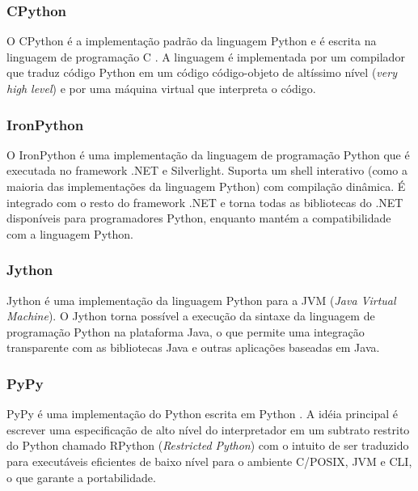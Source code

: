 \subsubsection{CPython}

O CPython é a implementação padrão da linguagem Python e é escrita na linguagem de programação C \cite[p.6]{pypy}. A linguagem é implementada por um compilador que traduz código Python em um código código-objeto de altíssimo nível (\emph{very high level}) e por uma máquina virtual que interpreta o código.

\subsubsection{IronPython}

O IronPython \cite{ironpython} é uma implementação da linguagem de programação Python que é executada no framework .NET e Silverlight. Suporta um shell interativo (como a maioria das implementações da linguagem Python) com compilação dinâmica. É integrado com o resto do framework .NET e torna todas as bibliotecas do .NET disponíveis para programadores Python, enquanto mantém a compatibilidade com a linguagem Python.

\subsubsection{Jython}

Jython \cite{jython} é uma implementação da linguagem Python para a JVM (\emph{Java Virtual Machine}). O Jython torna possível a execução da sintaxe da linguagem de programação Python na plataforma Java, o que permite uma integração transparente com as bibliotecas Java e outras aplicações baseadas em Java. 

\subsubsection{PyPy}

PyPy é uma implementação do Python escrita em Python \cite[p. 7]{pypy}. A idéia principal é escrever uma especificação de alto nível do interpretador em um subtrato restrito do Python chamado RPython (\emph{Restricted Python}) com o intuito de ser traduzido para executáveis eficientes de baixo nível para o ambiente C/POSIX, JVM e CLI, o que garante a portabilidade. 

